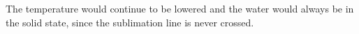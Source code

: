 The temperature would continue to be lowered and the water would always be in the solid state, since the sublimation line is never crossed.